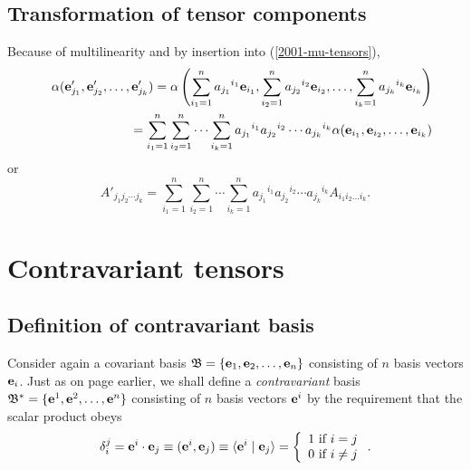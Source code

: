 \subsection{Transformation of tensor components}

Because of multilinearity  and by insertion into
(\ref{2001-mu-tensors}),
\begin{eqnarray}
&&\alpha ( {\bf e}'_{j_1},{\bf e}'_{j_2},\ldots ,{\bf e}'_{j_k})=
\alpha \left(
\sum_{i_1=1}^n {a_{j_1}}^{i_1} {\bf e}_{i_1},
\sum_{i_2=1}^n {a_{j_2}}^{i_2} {\bf e}_{i_2},
\ldots ,
\sum_{i_k=1}^n {a_{j_k}}^{i_k} {\bf e}_{i_k}
\right)
\nonumber \\&& \quad
=
\sum_{i_1=1}^n\sum_{i_2=1}^n\cdots \sum_{i_k=1}^n
{a_{j_1}}^{i_1}{a_{j_2}}^{i_2}\cdots {a_{j_k}}^{i_k} \alpha ( {\bf e}_{i_1},{\bf e}_{i_2},\ldots ,{\bf e}_{i_k})
\label{2012-m-ch-tensor-etotc1}
\end{eqnarray}
or
\begin{equation}
A'_{{j_1}{j_2}\cdots {j_k}}=
\sum_{i_1=1}^n\sum_{i_2=1}^n\cdots \sum_{i_k=1}^n
{a_{j_1}}^{i_1}{a_{j_2}}^{i_2}\cdots {a_{j_k}}^{i_k} A_{i_1 i_2\ldots i_k}.
\label{2011-m-tvtcov}
\end{equation}


\section{Contravariant tensors}

\subsection{Definition of contravariant basis}

Consider again a covariant basis
${\mathfrak B}=\{{\bf e}_1,{\bf e}_2,\ldots ,{\bf e}_n\}$ consisting of
$n$ basis vectors ${\bf e}_i$.
Just as on page \pageref{2011-m-Dualbasis} earlier, we shall define a {\em contravariant} basis
${\mathfrak B^\ast}=\{{\bf e}^1,{\bf e}^2,\ldots ,{\bf e}^n\}$ consisting of
$n$ basis vectors ${\bf e}^i$
by the requirement that the scalar product obeys
\begin{equation}
\delta_i^j =  {\bf e}^i\cdot{\bf e}_j\equiv ({\bf e}^i,{\bf e}_j)\equiv \langle {\bf e}^i\mid {\bf e}_j\rangle
 =\left\{
 \begin{array}{l}
1 \mbox{ if } i=j \\
0 \mbox{ if } i\neq j  \\
\end{array}
 \right. .
\label{2001-mu-tensors0}
\end{equation}



